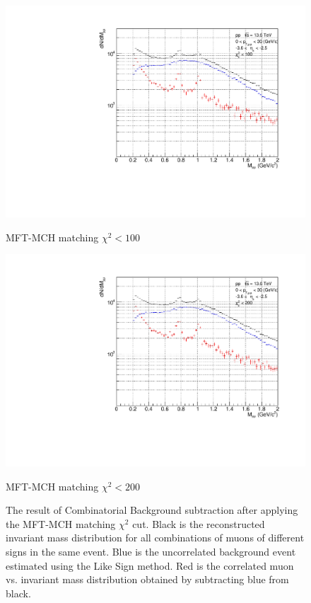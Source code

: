 \begin{figure}[H]
\begin{minipage}{0.45\textwidth}
                \end{minipage}
                \\
                \vspace{1em}
                \begin{minipage}{0.45\textwidth}
                    \centering
                    \includegraphics[width=\textwidth]{fig/3_4_4_CB_chi2_100.pdf}
                    \caption*{MFT-MCH matching $\chi^2 < 100$}
                \end{minipage}
                \hfill
                \begin{minipage}{0.45\textwidth}
                    \centering
                    \includegraphics[width=\textwidth]{fig/3_4_4_CB_chi2_200.pdf}
                    \caption*{MFT-MCH matching $\chi^2 < 200$}
                \end{minipage}
                \caption{The result of Combinatorial Background subtraction after applying the MFT-MCH matching $\chi^2$ cut. Black is the reconstructed invariant mass distribution for all combinations of muons of different signs in the same event. Blue is the uncorrelated background event estimated using the Like Sign method. Red is the correlated muon vs. invariant mass distribution obtained by subtracting blue from black.}
                \label{Analysis:Dimuon:Matching_CB}
            \end{figure}
